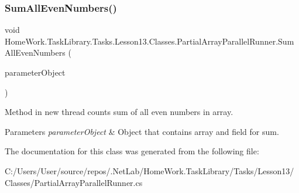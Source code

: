 \subsubsection{\texorpdfstring{SumAllEvenNumbers()}{SumAllEvenNumbers()}}
{\footnotesize\ttfamily void Home\+Work.\+Task\+Library.\+Tasks.\+Lesson13.\+Classes.\+Partial\+Array\+Parallel\+Runner.\+Sum\+All\+Even\+Numbers (\begin{DoxyParamCaption}\item[{ref \mbox{\hyperlink{class_home_work_1_1_task_library_1_1_tasks_1_1_lesson13_1_1_classes_1_1_partial_array_part}{Partial\+Array\+Part}}}]{parameter\+Object }\end{DoxyParamCaption})}



Method in new thread counts sum of all even numbers in array. 


\begin{DoxyParams}{Parameters}
{\em parameter\+Object} & Object that contains array and field for sum.\\
\hline
\end{DoxyParams}


The documentation for this class was generated from the following file\+:\begin{DoxyCompactItemize}
\item 
C\+:/\+Users/\+User/source/repos/.\+Net\+Lab/\+Home\+Work.\+Task\+Library/\+Tasks/\+Lesson13/\+Classes/Partial\+Array\+Parallel\+Runner.\+cs\end{DoxyCompactItemize}

